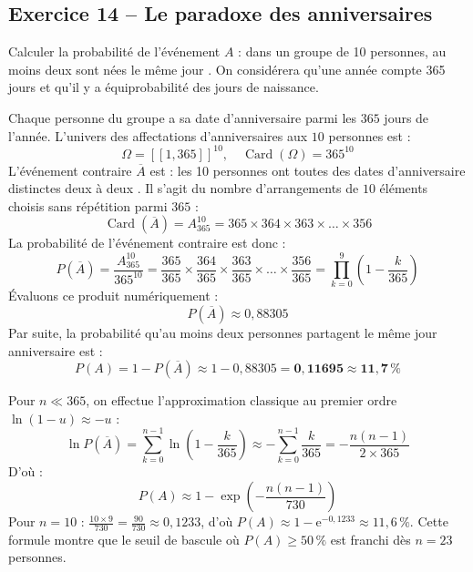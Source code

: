 \documentclass[11pt,a4paper]{article}
\newcommand{\e}{\mathrm{e}}
\begin{document}
\vspace{0.3cm}

\subsection*{Exercice 14 -- Le paradoxe des anniversaires}

Calculer la probabilité de l'événement $A$ : \og dans un groupe de 10 personnes, au moins deux sont nées le même jour \fg{}. On considérera qu'une année compte 365 jours et qu'il y a équiprobabilité des jours de naissance.

\begin{correctionbox}
Chaque personne du groupe a sa date d'anniversaire parmi les $365$ jours de l'année.
L'univers des affectations d'anniversaires aux $10$ personnes est :
\[
\Omega = [\![1, 365]\!]^{10}, \quad \operatorname{Card}(\Omega) = 365^{10}
\]
L'événement contraire $\overline{A}$ est : \og les 10 personnes ont toutes des dates d'anniversaire distinctes deux à deux \fg{}.
Il s'agit du nombre d'arrangements de $10$ éléments choisis sans répétition parmi $365$ :
\[
\operatorname{Card}(\overline{A}) = A_{365}^{10} = 365 \times 364 \times 363 \times \dots \times 356
\]
La probabilité de l'événement contraire est donc :
\[
P(\overline{A}) = \frac{A_{365}^{10}}{365^{10}} = \frac{365}{365} \times \frac{364}{365} \times \frac{363}{365} \times \dots \times \frac{356}{365} = \prod_{k=0}^9 \left(1 - \frac{k}{365}\right)
\]
Évaluons ce produit numériquement :
\[
P(\overline{A}) \approx 0{,}88305
\]
Par suite, la probabilité qu'au moins deux personnes partagent le même jour anniversaire est :
\[
P(A) = 1 - P(\overline{A}) \approx 1 - 0{,}88305 = \mathbf{0{,}11695} \approx \mathbf{11{,}7\,\%}
\]
\end{correctionbox}

\begin{remarquebox}
Pour $n \ll 365$, on effectue l'approximation classique au premier ordre $\ln(1 - u) \approx -u$ :
\[
\ln P(\overline{A}) = \sum_{k=0}^{n-1} \ln\left(1 - \frac{k}{365}\right) \approx -\sum_{k=0}^{n-1} \frac{k}{365} = -\frac{n(n-1)}{2 \times 365}
\]
D'où :
\[
P(A) \approx 1 - \exp\left(-\frac{n(n-1)}{730}\right)
\]
Pour $n = 10$ : $\frac{10 \times 9}{730} = \frac{90}{730} \approx 0{,}1233$, d'où $P(A) \approx 1 - \e^{-0{,}1233} \approx 11{,}6\,\%$.
Cette formule montre que le seuil de bascule où $P(A) \ge 50\,\%$ est franchi dès $n = 23$ personnes.
\end{remarquebox}
\end{document}
